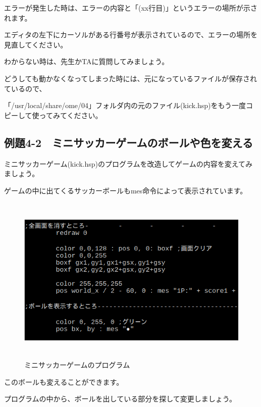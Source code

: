 エラーが発生した時は、エラーの内容と「(xx行目)」というエラーの場所が示されます。

エディタの左下にカーソルがある行番号が表示されているので、エラーの場所を見直してください。

わからない時は、先生かTAに質問してみましょう。

どうしても動かなくなってしまった時には、元になっているファイルが保存されているので、

「/usr/local/share/ome/04」フォルダ内の元のファイル(kick.hsp)をもう一度コピーして使ってみてください。
\newpage
\subsection{例題4-2　ミニサッカーゲームのボールや色を変える}

\begin{description}
    \item {}
\end{description}

ミニサッカーゲーム(kick.hsp)のプログラムを改造してゲームの内容を変えてみましょう。

ゲームの中に出てくるサッカーボールもmes命令によって表示されています。


\begin{figure}[H]
    \begin{center}
      \includegraphics[keepaspectratio,width=14.499cm,height=8.123cm]{text04-img/s_kicksrc2.png}
      \caption{ミニサッカーゲームのプログラム}
    \end{center}
    \label{fig:prog_menu}
\end{figure}


このボールも変えることができます。

プログラムの中から、ボールを出している部分を探して変更しましょう。



